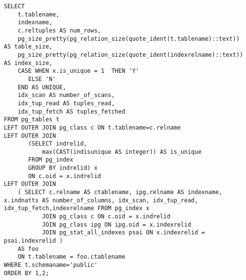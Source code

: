 \begin{lstlisting}[label=lst:snippets16,title=snippets/indexes\_statustic.sql]
SELECT
    t.tablename,
    indexname,
    c.reltuples AS num_rows,
    pg_size_pretty(pg_relation_size(quote_ident(t.tablename)::text)) AS table_size,
    pg_size_pretty(pg_relation_size(quote_ident(indexrelname)::text)) AS index_size,
    CASE WHEN x.is_unique = 1  THEN 'Y'
       ELSE 'N'
    END AS UNIQUE,
    idx_scan AS number_of_scans,
    idx_tup_read AS tuples_read,
    idx_tup_fetch AS tuples_fetched
FROM pg_tables t
LEFT OUTER JOIN pg_class c ON t.tablename=c.relname
LEFT OUTER JOIN
       (SELECT indrelid,
           max(CAST(indisunique AS integer)) AS is_unique
       FROM pg_index
       GROUP BY indrelid) x
       ON c.oid = x.indrelid
LEFT OUTER JOIN
    ( SELECT c.relname AS ctablename, ipg.relname AS indexname, x.indnatts AS number_of_columns, idx_scan, idx_tup_read, idx_tup_fetch,indexrelname FROM pg_index x
           JOIN pg_class c ON c.oid = x.indrelid
           JOIN pg_class ipg ON ipg.oid = x.indexrelid
           JOIN pg_stat_all_indexes psai ON x.indexrelid = psai.indexrelid )
    AS foo
    ON t.tablename = foo.ctablename
WHERE t.schemaname='public'
ORDER BY 1,2;
\end{lstlisting}


